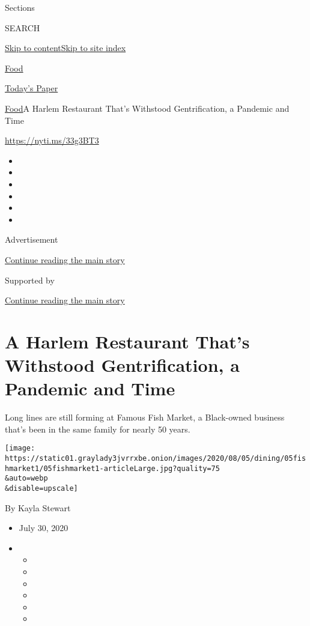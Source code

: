 Sections

SEARCH

\protect\hyperlink{site-content}{Skip to
content}\protect\hyperlink{site-index}{Skip to site index}

\href{https://www.nytimes3xbfgragh.onion/section/food}{Food}

\href{https://myaccount.nytimes3xbfgragh.onion/auth/login?response_type=cookie\&client_id=vi}{}

\href{https://www.nytimes3xbfgragh.onion/section/todayspaper}{Today's
Paper}

\href{/section/food}{Food}\textbar{}A Harlem Restaurant That's Withstood
Gentrification, a Pandemic and Time

\url{https://nyti.ms/33g3BT3}

\begin{itemize}
\item
\item
\item
\item
\item
\item
\end{itemize}

Advertisement

\protect\hyperlink{after-top}{Continue reading the main story}

Supported by

\protect\hyperlink{after-sponsor}{Continue reading the main story}

\hypertarget{a-harlem-restaurant-thats-withstood-gentrification-a-pandemic-and-time}{%
\section{A Harlem Restaurant That's Withstood Gentrification, a Pandemic
and
Time}\label{a-harlem-restaurant-thats-withstood-gentrification-a-pandemic-and-time}}

Long lines are still forming at Famous Fish Market, a Black-owned
business that's been in the same family for nearly 50 years.

\texttt{[image: https://static01.graylady3jvrrxbe.onion/images/2020/08/05/dining/05fishmarket1/05fishmarket1-articleLarge.jpg?quality=75\\\&auto=webp\\\&disable=upscale]}

By Kayla Stewart

\begin{itemize}
\item
  July 30, 2020
\item
  \begin{itemize}
  \item
  \item
  \item
  \item
  \item
  \item
  \end{itemize}
\end{itemize}

